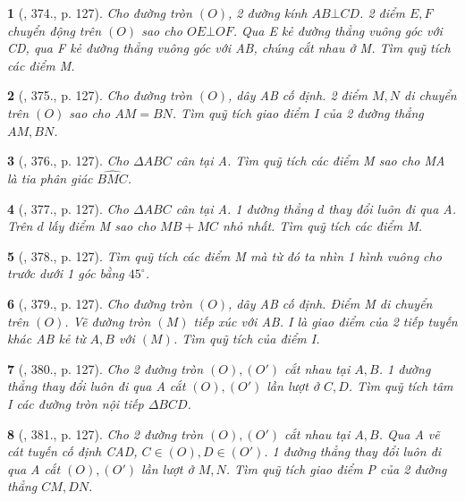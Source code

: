 \documentclass{article}
\newtheorem{baitoan}{}
\begin{document}
\begin{baitoan}[\cite{Binh_Toan_9_tap_2}, 374., p. 127]
	Cho đường tròn $(O)$, 2 đường kính $AB\bot CD$. 2 điểm $E,F$ chuyển động trên $(O)$ sao cho $OE\bot OF$. Qua E kẻ đường thẳng vuông góc với CD, qua F kẻ đường thẳng vuông góc với AB, chúng cắt nhau ở M. Tìm quỹ tích các điểm M.
\end{baitoan}

\begin{baitoan}[\cite{Binh_Toan_9_tap_2}, 375., p. 127]
	Cho đường tròn $(O)$, dây AB cố định. 2 điểm $M,N$ di chuyển trên $(O)$ sao cho $AM = BN$. Tìm quỹ tích giao điểm I của 2 đường thẳng $AM,BN$.
\end{baitoan}

\begin{baitoan}[\cite{Binh_Toan_9_tap_2}, 376., p. 127]
	Cho $\Delta ABC$ cân tại A. Tìm quỹ tích các điểm M sao cho MA là tia phân giác $\widehat{BMC}$.
\end{baitoan}

\begin{baitoan}[\cite{Binh_Toan_9_tap_2}, 377., p. 127]
	Cho $\Delta ABC$ cân tại A. 1 đường thẳng $d$ thay đổi luôn đi qua A. Trên $d$ lấy điểm M sao cho $MB + MC$ nhỏ nhất. Tìm quỹ tích các điểm M.
\end{baitoan}

\begin{baitoan}[\cite{Binh_Toan_9_tap_2}, 378., p. 127]
	Tìm quỹ tích các điểm M mà từ đó ta nhìn 1 hình vuông cho trước dưới 1 góc bằng $45^\circ$.
\end{baitoan}

\begin{baitoan}[\cite{Binh_Toan_9_tap_2}, 379., p. 127]
	Cho đường tròn $(O)$, dây AB cố định. Điểm M di chuyển trên $(O)$. Vẽ đường tròn $(M)$ tiếp xúc với AB. I là giao điểm của 2 tiếp tuyến khác AB kẻ từ $A,B$ với $(M)$. Tìm quỹ tích của điểm I.
\end{baitoan}

\begin{baitoan}[\cite{Binh_Toan_9_tap_2}, 380., p. 127]
	Cho 2 đường tròn $(O),(O')$ cắt nhau tại $A,B$. 1 đường thẳng thay đổi luôn đi qua A cắt $(O),(O')$ lần lượt ở $C,D$. Tìm quỹ tích tâm I các đường tròn nội tiếp $\Delta BCD$.
\end{baitoan}

\begin{baitoan}[\cite{Binh_Toan_9_tap_2}, 381., p. 127]
	Cho 2 đường tròn $(O),(O')$ cắt nhau tại $A,B$. Qua A vẽ cát tuyến cố định CAD, $C\in(O),D\in(O')$. 1 đường thẳng thay đổi luôn đi qua A cắt $(O),(O')$ lần lượt ở $M,N$. Tìm quỹ tích giao điểm P của 2 đường thẳng $CM,DN$.
\end{baitoan}
\end{document}
